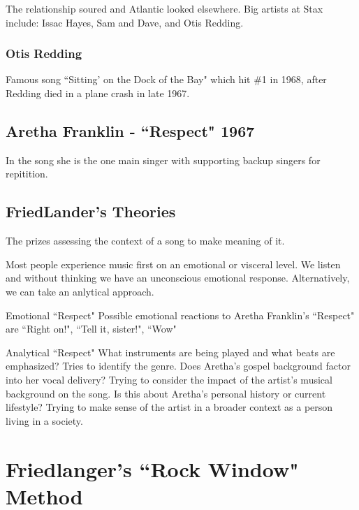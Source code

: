\documentclass[12pt, a4paper, twoside, openright, titlepage]{book}
\begin{document}
The relationship soured and Atlantic looked elsewhere. Big artists at Stax include: Issac Hayes, Sam and Dave, and Otis Redding.


\subsubsection{Otis Redding}

Famous song ``Sitting' on the Dock of the Bay" which hit \#1 in 1968, after Redding died in a plane crash in late 1967.


\subsection{Aretha Franklin - ``Respect" 1967}

In the song she is the one main singer with supporting backup singers for repitition. 

\subsection{FriedLander's Theories}

The  prizes assessing the context of a song to make meaning of it.


Most people experience music first on an emotional or visceral level. We listen and without thinking we have an unconscious emotional response. Alternatively, we can take an anlytical approach.


\begin{eg}{Emotional ``Respect"}{}
    Possible emotional reactions to Aretha Franklin's ``Respect" are ``Right on!", ``Tell it, sister!", ``Wow"
\end{eg}

\begin{eg}{Analytical ``Respect"}{}
    What instruments are being played and what beats are emphasized? Tries to identify the genre. Does Aretha's gospel background factor into her vocal delivery? Trying to consider the impact of the artist's musical background on the song. Is this about Aretha's personal history or current lifestyle? Trying to make sense of the artist in a broader context as a person living in a society.
\end{eg}

\section{Friedlanger's ``Rock Window" Method}
\end{document}
